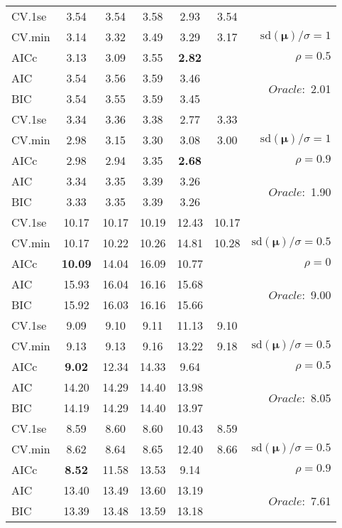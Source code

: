 \begin{table}
\begin{center}
\begin{tabular}{l*{5}{c}|r}
 \hline 
CV.1se & 3.54 & 3.54 & 3.58 & 2.93 & 3.54 & \\
CV.min & 3.14 & 3.32 & 3.49 & 3.29 & 3.17 &  $\mathrm{sd}(\mathbf{\mu})/\sigma=1$ \\
AICc & 3.13 & 3.09 & 3.55 & {\bf 2.82} & & $\rho=0.5$ \\
AIC & 3.54 & 3.56 & 3.59 & 3.46 & &  \multirow{2}{*}{$Oracle: $ 2.01} \\
BIC & 3.54 & 3.55 & 3.59 & 3.45 & &  \\
 \hline 
CV.1se & 3.34 & 3.36 & 3.38 & 2.77 & 3.33 & \\
CV.min & 2.98 & 3.15 & 3.30 & 3.08 & 3.00 &  $\mathrm{sd}(\mathbf{\mu})/\sigma=1$ \\
AICc & 2.98 & 2.94 & 3.35 & {\bf 2.68} & & $\rho=0.9$ \\
AIC & 3.34 & 3.35 & 3.39 & 3.26 & &  \multirow{2}{*}{$Oracle: $ 1.90} \\
BIC & 3.33 & 3.35 & 3.39 & 3.26 & &  \\
 \hline 
CV.1se & 10.17 & 10.17 & 10.19 & 12.43 & 10.17 & \\
CV.min & 10.17 & 10.22 & 10.26 & 14.81 & 10.28 &  $\mathrm{sd}(\mathbf{\mu})/\sigma=0.5$ \\
AICc & {\bf 10.09} & 14.04 & 16.09 & 10.77 & & $\rho=0$ \\
AIC & 15.93 & 16.04 & 16.16 & 15.68 & &  \multirow{2}{*}{$Oracle: $ 9.00} \\
BIC & 15.92 & 16.03 & 16.16 & 15.66 & &  \\
 \hline 
CV.1se & 9.09 & 9.10 & 9.11 & 11.13 & 9.10 & \\
CV.min & 9.13 & 9.13 & 9.16 & 13.22 & 9.18 &  $\mathrm{sd}(\mathbf{\mu})/\sigma=0.5$ \\
AICc & {\bf 9.02} & 12.34 & 14.33 & 9.64 & & $\rho=0.5$ \\
AIC & 14.20 & 14.29 & 14.40 & 13.98 & &  \multirow{2}{*}{$Oracle: $ 8.05} \\
BIC & 14.19 & 14.29 & 14.40 & 13.97 & &  \\
 \hline 
CV.1se & 8.59 & 8.60 & 8.60 & 10.43 & 8.59 & \\
CV.min & 8.62 & 8.64 & 8.65 & 12.40 & 8.66 &  $\mathrm{sd}(\mathbf{\mu})/\sigma=0.5$ \\
AICc & {\bf 8.52} & 11.58 & 13.53 & 9.14 & & $\rho=0.9$ \\
AIC & 13.40 & 13.49 & 13.60 & 13.19 & &  \multirow{2}{*}{$Oracle: $ 7.61} \\
BIC & 13.39 & 13.48 & 13.59 & 13.18 & &  \\
 \hline 
\end{tabular}
\end{center}
\vspace{-1cm}
\end{table}




